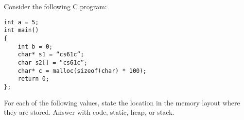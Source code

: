 \begin{blocksection}
\question
Consider the following C program:

\begin{verbatim}
int a = 5;
int main()
{
    int b = 0;
    char* s1 = “cs61c”;
    char s2[] = “cs61c”;
    char* c = malloc(sizeof(char) * 100);
    return 0;
};
\end{verbatim}

For each of the following values, state the location in the memory layout where they are stored. Answer with code, static, heap, or stack.

\end{blocksection}